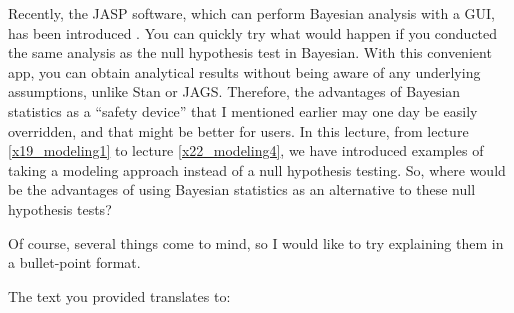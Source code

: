 \documentclass{ltjsbook}
\begin{document}
Recently, the JASP software, which can perform Bayesian analysis with a GUI, has been introduced \parencite{JASP2021}. You can quickly try what would happen if you conducted the same analysis as the null hypothesis test in Bayesian. With this convenient app, you can obtain analytical results without being aware of any underlying assumptions, unlike Stan or JAGS. Therefore, the advantages of Bayesian statistics as a “safety device” that I mentioned earlier may one day be easily overridden, and that might be better for users.
In this lecture, from lecture \ref{x19_modeling1} to lecture \ref{x22_modeling4}, we have introduced examples of taking a modeling approach instead of a null hypothesis testing.
So, where would be the advantages of using Bayesian statistics as an alternative to these null hypothesis tests?

Of course, several things come to mind, so I would like to try explaining them in a bullet-point format.

The text you provided translates to:
\end{document}

